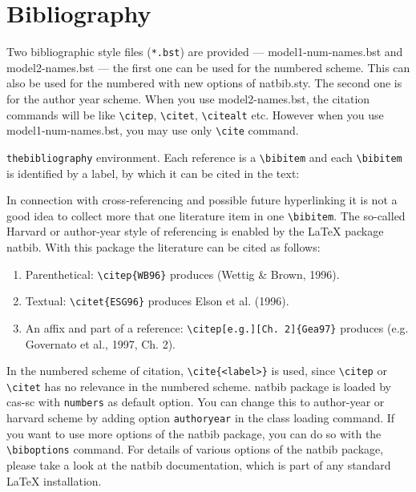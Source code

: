 \documentclass[a4paper,fleqn]{cas-sc}
\begin{document}
				\section{Bibliography}
				
				Two bibliographic style files (\verb+*.bst+) are provided ---
				{model1-num-names.bst} and {model2-names.bst} --- the first one can be
				used for the numbered scheme. This can also be used for the numbered
				with new options of {natbib.sty}. The second one is for the author year
				scheme. When  you use model2-names.bst, the citation commands will be
				like \verb+\citep+,  \verb+\citet+, \verb+\citealt+ etc. However when
				you use model1-num-names.bst, you may use only \verb+\cite+ command.
				
				\verb+thebibliography+ environment.  Each reference is a
				\verb+\bibitem+ and each \verb+\bibitem+ is identified by a label,
				by which it can be cited in the text:
				
				\noindent In connection with cross-referencing and
				possible future hyperlinking it is not a good idea to collect
				more that one literature item in one \verb+\bibitem+.  The
				so-called Harvard or author-year style of referencing is enabled
				by the \LaTeX{} package {natbib}. With this package the
				literature can be cited as follows:
				
				
				\begin{enumerate}[\textbullet]
					\item Parenthetical: \verb+\citep{WB96}+ produces (Wettig \& Brown, 1996).
					\item Textual: \verb+\citet{ESG96}+ produces Elson et al. (1996).
					\item An affix and part of a reference:
					\verb+\citep[e.g.][Ch. 2]{Gea97}+ produces (e.g. Governato et
					al., 1997, Ch. 2).
				\end{enumerate}
				
				In the numbered scheme of citation, \verb+\cite{<label>}+ is used,
				since \verb+\citep+ or \verb+\citet+ has no relevance in the numbered
				scheme.  {natbib} package is loaded by {cas-sc} with
				\verb+numbers+ as default option.  You can change this to author-year
				or harvard scheme by adding option \verb+authoryear+ in the class
				loading command.  If you want to use more options of the {natbib}
				package, you can do so with the \verb+\biboptions+ command.  For
				details of various options of the {natbib} package, please take a
				look at the {natbib} documentation, which is part of any standard
				\LaTeX{} installation.
				
\end{document}
